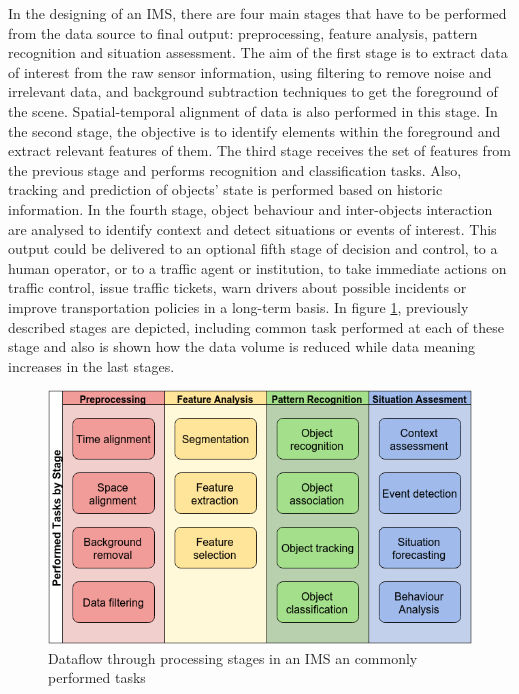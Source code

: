 In the designing of an IMS, there are four main stages that have to be performed from the data source to final output: preprocessing, feature analysis, pattern recognition and situation assessment. The aim of the first stage is to extract data of interest from the raw sensor information, using filtering to remove noise and irrelevant data, and background subtraction techniques to get the foreground of the scene. Spatial-temporal alignment of data is also performed in this stage. In the second stage, the objective is to identify elements within the foreground and extract relevant features of them. The third stage receives the set of features from the previous stage and performs recognition and classification tasks. Also, tracking and prediction of objects' state is performed based on historic information. In the fourth stage, object behaviour and inter-objects interaction are analysed to identify context and detect situations or events of interest. This output could be delivered to an optional fifth stage of decision and control, to a human operator, or to a traffic agent or institution, to take immediate actions on traffic control, issue traffic tickets, warn drivers about possible incidents or improve transportation policies in a long-term basis. In figure \ref{proc_stages}, previously described stages are depicted, including common task performed at each of these stage and also is shown how the data volume is reduced while data meaning increases in the last stages. 

\begin{figure}[ht!]
\centering
\includegraphics[scale=0.55]{fig/3/processing_stages_and_tasks.png}
\caption{Dataflow through processing stages in an IMS an commonly performed tasks}
\label{proc_stages}
\end{figure}


